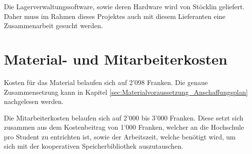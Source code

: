 Die Lagerverwaltungssoftware, sowie deren Hardware wird von Stöcklin geliefert. Daher muss im Rahmen dieses Projektes auch mit diesem Lieferanten eine Zusammenarbeit gesucht werden.

\section{Material- und Mitarbeiterkosten}
Kosten für das Material belaufen sich auf 2'098 Franken. Die genaue Zusammensetzung kann in Kapitel \ref{sec:Materialvoraussetzung_Anschaffungsplan} nachgelesen werden.

Die Mitarbeiterkosten belaufen sich auf 2'000 bis 3'000 Franken. Diese setzt sich zusammen aus dem Kostenbeitrag von 1'000 Franken, welcher an die Hochschule pro Student zu entrichten ist, sowie der Arbeitszeit, welche benötigt wird, um sich mit der kooperativen Speicherbibliothek auszutauschen.

